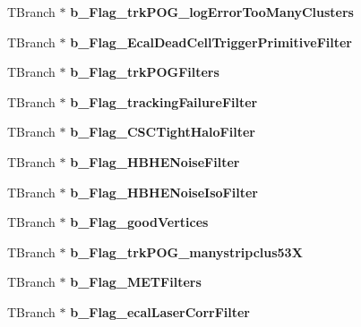 \begin{DoxyCompactItemize}
T\+Branch $\ast$ {\bfseries b\+\_\+\+Flag\+\_\+trk\+P\+O\+G\+\_\+log\+Error\+Too\+Many\+Clusters}
\item 
\hypertarget{classMiniTree_a576bf7999dc38e23b553f73100529981}{}\label{classMiniTree_a576bf7999dc38e23b553f73100529981} 
T\+Branch $\ast$ {\bfseries b\+\_\+\+Flag\+\_\+\+Ecal\+Dead\+Cell\+Trigger\+Primitive\+Filter}
\item 
\hypertarget{classMiniTree_a2209e8c721c1aadac45985a300179a52}{}\label{classMiniTree_a2209e8c721c1aadac45985a300179a52} 
T\+Branch $\ast$ {\bfseries b\+\_\+\+Flag\+\_\+trk\+P\+O\+G\+Filters}
\item 
\hypertarget{classMiniTree_a97abd14fc2ea74d1f1dd53814f983d41}{}\label{classMiniTree_a97abd14fc2ea74d1f1dd53814f983d41} 
T\+Branch $\ast$ {\bfseries b\+\_\+\+Flag\+\_\+tracking\+Failure\+Filter}
\item 
\hypertarget{classMiniTree_abf8d92df744074f1258ec01d3e9bb1d2}{}\label{classMiniTree_abf8d92df744074f1258ec01d3e9bb1d2} 
T\+Branch $\ast$ {\bfseries b\+\_\+\+Flag\+\_\+\+C\+S\+C\+Tight\+Halo\+Filter}
\item 
\hypertarget{classMiniTree_a9bbde2201f9956d4a2a2be397150da0c}{}\label{classMiniTree_a9bbde2201f9956d4a2a2be397150da0c} 
T\+Branch $\ast$ {\bfseries b\+\_\+\+Flag\+\_\+\+H\+B\+H\+E\+Noise\+Filter}
\item 
\hypertarget{classMiniTree_a8a64585e3456c6fe732167da75d16b54}{}\label{classMiniTree_a8a64585e3456c6fe732167da75d16b54} 
T\+Branch $\ast$ {\bfseries b\+\_\+\+Flag\+\_\+\+H\+B\+H\+E\+Noise\+Iso\+Filter}
\item 
\hypertarget{classMiniTree_a282ab79bd19cf92c517ce437240bbffa}{}\label{classMiniTree_a282ab79bd19cf92c517ce437240bbffa} 
T\+Branch $\ast$ {\bfseries b\+\_\+\+Flag\+\_\+good\+Vertices}
\item 
\hypertarget{classMiniTree_a49ae1fad98c1be3d67c31592df445067}{}\label{classMiniTree_a49ae1fad98c1be3d67c31592df445067} 
T\+Branch $\ast$ {\bfseries b\+\_\+\+Flag\+\_\+trk\+P\+O\+G\+\_\+manystripclus53X}
\item 
\hypertarget{classMiniTree_a9b05b44153851411fc5940b7cd67ab80}{}\label{classMiniTree_a9b05b44153851411fc5940b7cd67ab80} 
T\+Branch $\ast$ {\bfseries b\+\_\+\+Flag\+\_\+\+M\+E\+T\+Filters}
\item 
\hypertarget{classMiniTree_a13060b492bacceb40faf9989ff8be579}{}\label{classMiniTree_a13060b492bacceb40faf9989ff8be579} 
T\+Branch $\ast$ {\bfseries b\+\_\+\+Flag\+\_\+ecal\+Laser\+Corr\+Filter}
\item 
\hypertarget{classMiniTree_a4254d93cd1555069005d4eb7c3c01754}{}\label{classMiniTree_a4254d93cd1555069005d4eb7c3c01754} 

\end{DoxyCompactItemize}
